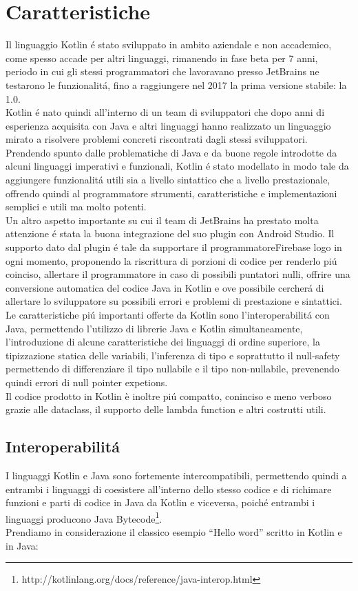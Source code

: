 \section{Caratteristiche}
Il linguaggio Kotlin \'e stato sviluppato in ambito aziendale e non accademico, come spesso accade per altri linguaggi, rimanendo in fase beta  per 7 anni, periodo in cui gli stessi programmatori che lavoravano presso JetBrains ne testarono le funzionalit\'a, fino a raggiungere nel 2017 la prima versione stabile: la 1.0. \\
Kotlin \'e nato quindi all'interno di un team di sviluppatori che dopo anni di esperienza acquisita con Java e altri linguaggi hanno realizzato un linguaggio mirato a risolvere problemi concreti riscontrati dagli stessi sviluppatori.\\
Prendendo spunto dalle problematiche di Java e da buone regole introdotte da alcuni linguaggi imperativi e funzionali, Kotlin \'e stato modellato in modo tale da aggiungere funzionalit\'a utili sia a livello sintattico che a livello prestazionale, offrendo quindi al programmatore strumenti, caratteristiche e implementazioni semplici e utili ma molto potenti.\\
Un altro aspetto importante su cui il team di JetBrains ha prestato molta attenzione \'e stata la buona integrazione del suo plugin con Android Studio. Il supporto dato dal plugin \'e tale da supportare il programmatoreFirebase logo in ogni momento, proponendo la riscrittura di porzioni di codice per renderlo pi\'u coinciso, allertare il programmatore in caso di possibili puntatori nulli, offrire una conversione automatica del codice Java in Kotlin e ove possibile cercher\'a di allertare lo sviluppatore su possibili errori e problemi di prestazione e sintattici.\\
Le caratteristiche pi\'u importanti offerte da Kotlin sono l'interoperabilit\'a con Java, permettendo l'utilizzo di librerie Java e Kotlin simultaneamente, l'introduzione di alcune caratteristiche dei linguaggi di ordine superiore, la tipizzazione statica delle variabili, l'inferenza di tipo e soprattutto il null-safety permettendo di differenziare il tipo nullabile e il tipo non-nullabile, prevenendo quindi errori di null pointer expetions.\\
Il codice prodotto in Kotlin \`e inoltre pi\'u compatto, coninciso e meno verboso grazie alle dataclass, il supporto delle lambda function e altri costrutti utili.


\subsection{Interoperabilit\'a}
I linguaggi Kotlin e Java sono fortemente intercompatibili, permettendo quindi a entrambi i linguaggi di coesistere all'interno dello stesso codice e di richimare funzioni e parti di codice in Java da Kotlin e viceversa, poich\'e entrambi i linguaggi producono Java Bytecode\footnote{http://kotlinlang.org/docs/reference/java-interop.html}.\\
Prendiamo in considerazione il classico esempio ``Hello word'' scritto in Kotlin e in Java:

